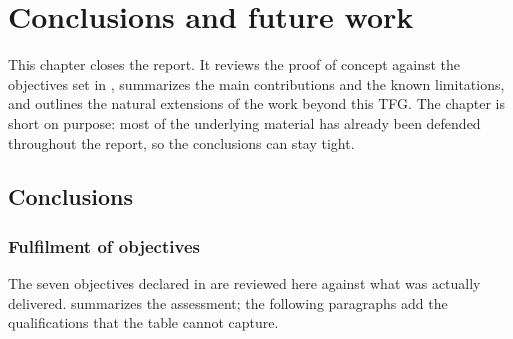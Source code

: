 %

\chapter{Conclusions and future work}
\label{ch:conclusiones}

This chapter closes the report. It reviews the proof of concept
against the objectives set in , summarizes the
main contributions and the known limitations, and outlines the
natural extensions of the work beyond this TFG. The chapter is short
on purpose: most of the underlying material has already been
defended throughout the report, so the conclusions can stay tight.

\section{Conclusions}
\label{sec:conclusiones}

\subsection{Fulfilment of objectives}

The seven objectives declared in  are reviewed
here against what was actually delivered. 
summarizes the assessment; the following paragraphs add the
qualifications that the table cannot capture.

